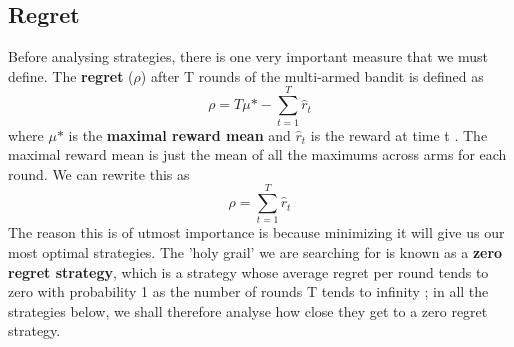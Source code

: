 \subsection{Regret}\label{subsec:regret}
Before analysing strategies, there is one very important measure that we must define.
The \textbf{regret} ($\rho$) after T rounds of the multi-armed bandit is defined as $$\rho = T\mu\mbox{*} - \sum_{t=1}^T\hat{r}_t$$ where $\mu\mbox{*}$ is the \textbf{maximal reward mean} and $\hat{r}_t$ is the reward at time t \citep{vermorel}.
The maximal reward mean is just the mean of all the maximums across arms for each round.
We can rewrite this as $$\rho = \sum_{t=1}^T\hat{r}_t$$ The reason this is of utmost importance is because minimizing it will give us our most optimal strategies. The 'holy grail' we are searching for is known as a \textbf{zero regret strategy}, which is a strategy whose average regret per round tends to zero with probability 1 as the number of rounds T tends to infinity \citep{vermorel}; in all the strategies below, we shall therefore analyse how close they get to a zero regret strategy.
